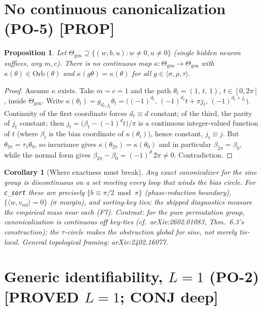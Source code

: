 \documentclass[11pt]{article}
\newtheorem{proposition}[theorem]{Proposition}
\newtheorem{corollary}[theorem]{Corollary}
\begin{document}
\section{No continuous canonicalization (PO-5) [PROP]}

\begin{proposition}\label{prop:po5}
Let $\Theta_{\mathrm{gen}}\supseteq\{(w,b,u): w\ne0,u\ne0\}$ (single hidden neuron suffices, any
$m,c$). There is no continuous map $\kappa:\Theta_{\mathrm{gen}}\to\Theta_{\mathrm{gen}}$ with
$\kappa(\theta)\in\mathrm{Orb}(\theta)$ and $\kappa(g\theta)=\kappa(\theta)$ for all
$g\in\langle\sigma,\rho,\tau\rangle$.
\end{proposition}

\begin{proof}
Assume $\kappa$ exists. Take $m=c=1$ and the path $\theta_t=(1,\,t,\,1)$, $t\in[0,2\pi]$, inside
$\Theta_{\mathrm{gen}}$. Write $\kappa(\theta_t)=g_{d_t,j_t}\theta_t=\big((-1)^{d_t},\,
(-1)^{d_t}t+\pi j_t,\,(-1)^{d_t+j_t}\big)$. Continuity of the first coordinate forces $d_t\equiv d$
constant; of the third, the parity of $j_t$ constant; then
$j_t=\big(\beta_t-(-1)^dt\big)/\pi$ is a continuous integer-valued function of $t$ (where
$\beta_t$ is the bias coordinate of $\kappa(\theta_t)$), hence constant, $j_t\equiv j$. But
$\theta_{2\pi}=\tau_1\theta_0$, so invariance gives $\kappa(\theta_{2\pi})=\kappa(\theta_0)$ and
in particular $\beta_{2\pi}=\beta_0$, while the normal form gives
$\beta_{2\pi}-\beta_0=(-1)^d\,2\pi\ne0$. Contradiction. \qedhere
\end{proof}

\begin{corollary}[Where exactness must break]
Any exact canonicalizer for the sine group is discontinuous on a set meeting every loop that
winds the bias circle. For \texttt{c\_sort} these are precisely $\{b\equiv\pi/2 \bmod \pi\}$
(phase-reduction boundary), $\{\langle w,v_{\mathrm{ref}}\rangle=0\}$ ($\sigma$ margin), and
sorting-key ties; the shipped diagnostics measure the empirical mass near each (F7). Contrast:
for the pure permutation group, canonicalization is continuous off key-ties
(cf.\ arXiv:2602.01083, Thm.~6.3's construction); the $\tau$-circle makes the obstruction global
for sine, not merely tie-local. General topological framing: arXiv:2402.16077.
\end{corollary}

\section{Generic identifiability, $L=1$ (PO-2) [PROVED $L{=}1$; CONJ deep]}
\end{document}
